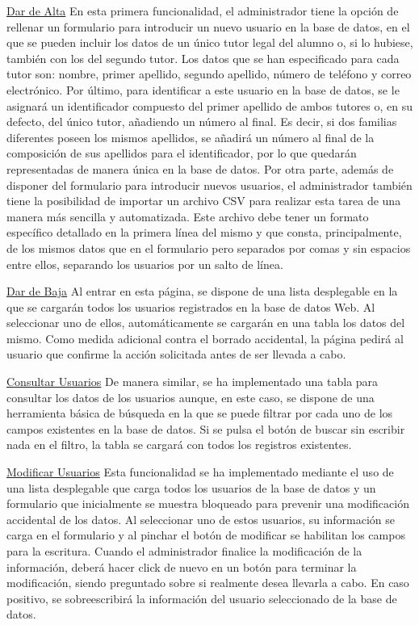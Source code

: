 \newpage

\noindent \underline{Dar de Alta} \newline
En esta primera funcionalidad, el administrador tiene la opción de rellenar un formulario para introducir un nuevo usuario en la base de datos, en el que se pueden incluir los datos de un único tutor legal del alumno o, si lo hubiese, también con los del segundo tutor. Los datos que se han especificado para cada tutor son: nombre, primer apellido, segundo apellido, número de teléfono y correo electrónico. Por último, para identificar a este usuario en la base de datos, se le asignará un identificador compuesto del primer apellido de ambos tutores o, en su defecto, del único tutor, añadiendo un número al final. Es decir, si dos familias diferentes poseen los mismos apellidos, se añadirá un número al final de la composición de sus apellidos para el identificador, por lo que quedarán representadas de manera única en la base de datos. Por otra parte, además de disponer del formulario para introducir nuevos usuarios, el administrador también tiene la posibilidad de importar un archivo \acs{CSV} para realizar esta tarea de una manera más sencilla y automatizada. Este archivo debe tener un formato específico detallado en la primera línea del mismo y que consta, principalmente, de los mismos datos que en el formulario pero separados por comas y sin espacios entre ellos, separando los usuarios por un salto de línea.

\noindent \underline{Dar de Baja} \newline
Al entrar en esta página, se dispone de una lista desplegable en la que se cargarán todos los usuarios registrados en la base de datos Web. Al seleccionar uno de ellos, automáticamente se cargarán en una tabla los datos del mismo. Como medida adicional contra el borrado accidental, la página pedirá al usuario que confirme la acción solicitada antes de ser llevada a cabo.

\noindent \underline{Consultar Usuarios} \newline
De manera similar, se ha implementado una tabla para consultar los datos de los usuarios aunque, en este caso, se dispone de una herramienta básica de búsqueda en la que se puede filtrar por cada uno de los campos existentes en la base de datos. Si se pulsa el botón de buscar sin escribir nada en el filtro, la tabla se cargará con todos los registros existentes.

\noindent \underline{Modificar Usuarios} \newline
Esta funcionalidad se ha implementado mediante el uso de una lista desplegable que carga todos los usuarios de la base de datos y un formulario que inicialmente se muestra bloqueado para prevenir una modificación accidental de los datos. Al seleccionar uno de estos usuarios, su información se carga en el formulario y al pinchar el botón de modificar se habilitan los campos para la escritura. Cuando el administrador finalice la modificación de la información, deberá hacer click de nuevo en un botón para terminar la modificación, siendo preguntado sobre si realmente desea llevarla a cabo. En caso positivo, se sobreescribirá la información del usuario seleccionado de la base de datos.

